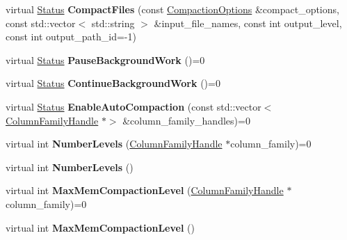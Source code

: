 \begin{DoxyCompactItemize}
\item 
virtual \hyperlink{classrocksdb_1_1Status}{Status} {\bfseries Compact\+Files} (const \hyperlink{structrocksdb_1_1CompactionOptions}{Compaction\+Options} \&compact\+\_\+options, const std\+::vector$<$ std\+::string $>$ \&input\+\_\+file\+\_\+names, const int output\+\_\+level, const int output\+\_\+path\+\_\+id=-\/1)\hypertarget{classrocksdb_1_1DB_a3158273244f418b65d9f04caff0d7368}{}\label{classrocksdb_1_1DB_a3158273244f418b65d9f04caff0d7368}

\item 
virtual \hyperlink{classrocksdb_1_1Status}{Status} {\bfseries Pause\+Background\+Work} ()=0\hypertarget{classrocksdb_1_1DB_af392b40e23a8db606e8ee220e5a58c00}{}\label{classrocksdb_1_1DB_af392b40e23a8db606e8ee220e5a58c00}

\item 
virtual \hyperlink{classrocksdb_1_1Status}{Status} {\bfseries Continue\+Background\+Work} ()=0\hypertarget{classrocksdb_1_1DB_acb9cd7be26b415f52f33e65f3c5be02e}{}\label{classrocksdb_1_1DB_acb9cd7be26b415f52f33e65f3c5be02e}

\item 
virtual \hyperlink{classrocksdb_1_1Status}{Status} {\bfseries Enable\+Auto\+Compaction} (const std\+::vector$<$ \hyperlink{classrocksdb_1_1ColumnFamilyHandle}{Column\+Family\+Handle} $\ast$$>$ \&column\+\_\+family\+\_\+handles)=0\hypertarget{classrocksdb_1_1DB_acd233aa1070ea21b4bc329fdf1fdf277}{}\label{classrocksdb_1_1DB_acd233aa1070ea21b4bc329fdf1fdf277}

\item 
virtual int {\bfseries Number\+Levels} (\hyperlink{classrocksdb_1_1ColumnFamilyHandle}{Column\+Family\+Handle} $\ast$column\+\_\+family)=0\hypertarget{classrocksdb_1_1DB_a6581ba7d28b51491faebe55a7df500b1}{}\label{classrocksdb_1_1DB_a6581ba7d28b51491faebe55a7df500b1}

\item 
virtual int {\bfseries Number\+Levels} ()\hypertarget{classrocksdb_1_1DB_aa8becbddfcbd7353aa3a21ef955a9c46}{}\label{classrocksdb_1_1DB_aa8becbddfcbd7353aa3a21ef955a9c46}

\item 
virtual int {\bfseries Max\+Mem\+Compaction\+Level} (\hyperlink{classrocksdb_1_1ColumnFamilyHandle}{Column\+Family\+Handle} $\ast$column\+\_\+family)=0\hypertarget{classrocksdb_1_1DB_a25dedb3ebc958c5dfff1eee4453fbd56}{}\label{classrocksdb_1_1DB_a25dedb3ebc958c5dfff1eee4453fbd56}

\item 
virtual int {\bfseries Max\+Mem\+Compaction\+Level} ()\hypertarget{classrocksdb_1_1DB_a5762e92e3e20880efd3a399c5a0e0ae5}{}\label{classrocksdb_1_1DB_a5762e92e3e20880efd3a399c5a0e0ae5}


\end{DoxyCompactItemize}

